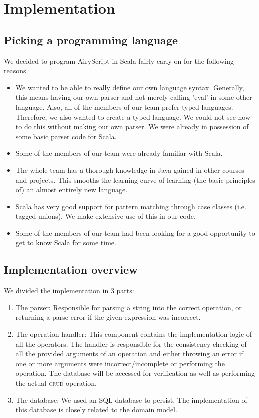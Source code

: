 \section{Implementation}

\subsection{Picking a programming language}
We decided to program AiryScript in Scala fairly early on for the following
reasons.
\begin{itemize}
  \item We wanted to be able to really define our own language syntax.
    Generally, this means having our own parser and not merely calling 'eval' in
    some other language. Also, all of the members of our team prefer typed
    languages. Therefore, we also wanted to create a typed language. We could
    not see how to do this without making our own parser. We were already in
    possession of some basic parser code for Scala.
  \item Some of the members of our team were already familiar with Scala.
  \item The whole team has a thorough knowledge in Java gained in other courses
  and projects. This smooths the learning curve of learning (the basic
  principles of) an almost entirely new language. 
  \item Scala has very good support for pattern matching through case classes
    (i.e. tagged unions). We make extensive use of this in our code.
  \item Some of the members of our team had been looking for a good opportunity
    to get to know Scala for some time.
\end{itemize}


\subsection{Implementation overview}

We divided the implementation in 3 parts:
\begin{enumerate}
\item The parser: Responsible for parsing a string into the correct operation,
or returning a parse error if the given expression was incorrect.
\item The operation handler: This component contains the implementation logic
of all the operators. The handler is responsible for the consistency checking of
all the provided arguments of an operation and either throwing an error if one
or more arguments were incorrect/incomplete or performing the operation. The
database will be accessed for verification as well as performing the actual
\textsc{crud} operation.
\item The database: We used an SQL database to persist. The
implementation of this database is closely related to the domain model.
\end{enumerate} 
	

